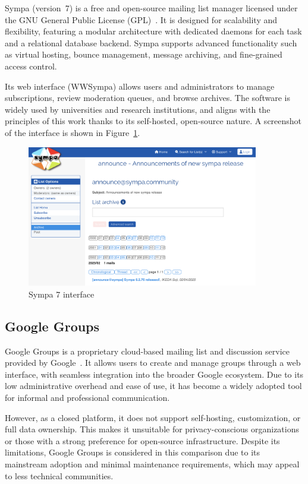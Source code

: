 Sympa (version~7) is a free and open-source mailing list manager licensed under the GNU General Public License (GPL)~\cite{sympa-docs}. It is designed for scalability and flexibility, featuring a modular architecture with dedicated daemons for each task and a relational database backend. Sympa supports advanced functionality such as virtual hosting, bounce management, message archiving, and fine-grained access control.

Its web interface (WWSympa) allows users and administrators to manage subscriptions, review moderation queues, and browse archives. The software is widely used by universities and research institutions, and aligns with the principles of this work thanks to its self-hosted, open-source nature. A screenshot of the interface is shown in Figure~\ref{fig:sympa}.

\begin{figure}[H]
  \centering
  \includegraphics[width=0.9\textwidth]{imaxes/sympa.png}
  \caption{Sympa 7 interface}
  \label{fig:sympa}
\end{figure}

\subsection{Google Groups}

Google Groups is a proprietary cloud-based mailing list and discussion service provided by Google~\cite{google-groups-docs}. It allows users to create and manage groups through a web interface, with seamless integration into the broader Google ecosystem. Due to its low administrative overhead and ease of use, it has become a widely adopted tool for informal and professional communication.

However, as a closed platform, it does not support self-hosting, customization, or full data ownership. This makes it unsuitable for privacy-conscious organizations or those with a strong preference for open-source infrastructure. Despite its limitations, Google Groups is considered in this comparison due to its mainstream adoption and minimal maintenance requirements, which may appeal to less technical communities.

